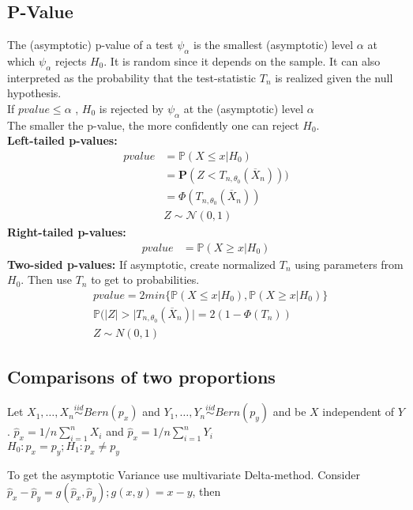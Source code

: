 \subsection{P-Value}
The (asymptotic) p-value of a test $\psi_{\alpha}$ is the smallest (asymptotic) level $\alpha$ at which $\psi_{\alpha}$ rejects $H_0$. It is random since it depends on the sample. It can also interpreted as the probability that the test-statistic $T_n$ is realized given the null hypothesis.\\

If $pvalue \leq \alpha$ , $H_0$ is rejected by $\psi_{\alpha}$ at the (asymptotic) level $\alpha$\\

The smaller the p-value, the more confidently one can reject $H_0$.\\
\textbf{Left-tailed p-values:}
\begin{align*}
pvalue&=\mathbb{P}(X\leq x|H_0)\\
&=\mathbf{P}( Z < T_{n,\theta _0}(\overline{X}_ n)))\\
&=\Phi (T_{n,\theta _0}(\overline{X}_ n))\\
&Z\sim \mathcal{N}(0,1)	
\end{align*}
\textbf{Right-tailed p-values:}
\begin{align*}
	pvalue&=\mathbb{P}(X\geq x|H_0)
\end{align*}
\textbf{Two-sided p-values:}
If asymptotic, create normalized $T_n$ using parameters from $H_0$. Then use $T_n$ to get to probabilities.
\begin{align*}
&pvalue=2 min\{\mathbb{P}(X\leq x|H_0),\mathbb{P}(X\geq x|H_0)\}\\
&\mathbb{P}(\lvert Z\rvert > \lvert T_{n,\theta _0}(\overline{X}_ n)\rvert = 2(1-\Phi(T_n))\\
&Z \sim N(0,1)
\end{align*}
\subsection{Comparisons of two proportions}

Let $X_1,\dots ,X_ n \stackrel{iid}{\sim} Bern(p_x)$ and  $Y_1,\dots ,Y_ n \stackrel{iid}{\sim} Bern(p_y)$ and be $X$ independent of $Y$. $\hat{p}_x= 1/n \sum_{i=1}^{n} X_i$ and $\hat{p}_x= 1/n \sum_{i=1}^{n} Y_i$\\

$H_0: p_x = p_y; H_1: p_x \neq p_y$

To get the asymptotic Variance use multivariate Delta-method. Consider $\hat{p}_x - \hat{p}_y = g(\hat{p}_x,\hat{p}_y); g(x,y)= x -y$, then

